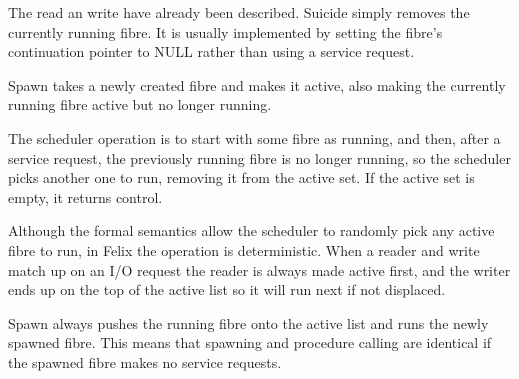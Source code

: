\documentclass[oneside]{book}
\begin{document}
The read an write have already been described. Suicide simply removes the
currently running fibre. It is usually implemented by setting the fibre's
continuation pointer to NULL rather than using a service request.

Spawn takes a newly created fibre and makes it active, also making
the currently running fibre active but no longer running.

The scheduler operation is to start with some fibre as running,
and then, after a service request, the previously running fibre
is no longer running, so the scheduler picks another one to run,
removing it from the active set. If the active set is empty,
it returns control.

Although the formal semantics allow the scheduler to randomly pick
any active fibre to run, in Felix the operation is deterministic.
When a reader and write match up on an I/O request the reader is
always made active first, and the writer ends up on the top
of the active list so it will run next if not displaced.

Spawn always pushes the running fibre onto the active list and runs
the newly spawned fibre. This means that spawning and procedure
calling are identical if the spawned fibre makes no service
requests.


\clearpage
{}
{}
\listoflistings
%
\clearpage
{}
\printindex[codeindex] 
%
\clearpage
{}
\printindex
%
\end{document}
